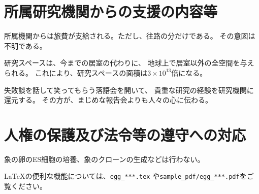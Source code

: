 \documentclass[11pt,a4j,dvipdfmx]{jarticle} 					%
\newcommand{\研究課題名}{象の卵}
\newcommand{\研究機関名}{逢坂大学}
\newcommand{\研究代表者氏名}{湯川秀樹}
\begin{document}

\section{所属研究機関からの支援の内容等 }

\JSPSInstructions	%

	所属機関からは旅費が支給される。ただし、往路の分だけである。
	その意図は不明である。
	
	研究スペースは、今までの居室の代わりに、
	地球上で居室以外の全空間を与えられる。
	これにより、研究スペースの面積は\(3 \times 10^{13}\)倍になる。
	
	失敗談を話して笑ってもらう落語会を開いて、
	貴重な研究の経験を研究機関に還元する。
	その方が、まじめな報告会よりも人々の心に伝わる。




\section{人権の保護及び法令等の遵守への対応 }

	象の卵のES細胞の培養、象のクローンの生成などは行わない。

	\LaTeX の便利な機能については、\texttt{egg\_***.tex} や\texttt{sample\_pdf/egg\_***.pdf}をご覧ください。



\end{document}
